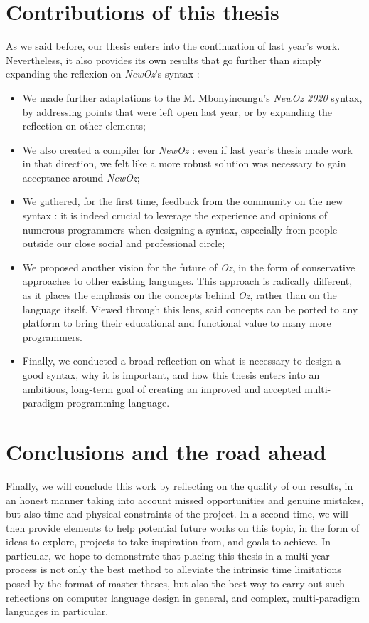 \section{Contributions of this thesis}\label{sec:ch1-3}
As we said before, our thesis enters into the continuation of last year's work.
Nevertheless, it also provides its own results that go further than simply expanding the reflexion on \textit{NewOz}'s syntax :
\begin{itemize}
    \item We made further adaptations to the M. Mbonyincungu's \textit{NewOz 2020} syntax, by addressing points that were left open last year, or by expanding the reflection on other elements;
    \item We also created a compiler for \textit{NewOz} : even if last year's thesis made work in that direction, we felt like a more robust solution was necessary to gain acceptance around \textit{NewOz};
    \item We gathered, for the first time, feedback from the community on the new syntax : it is indeed crucial to leverage the experience and opinions of numerous programmers when designing a syntax, especially from people outside our close social and professional circle;
    \item We proposed another vision for the future of \textit{Oz}, in the form of conservative approaches to other existing languages.
    This approach is radically different, as it places the emphasis on the concepts behind \textit{Oz}, rather than on the language itself.
    Viewed through this lens, said concepts can be ported to any platform to bring their educational and functional value to many more programmers.
    \item Finally, we conducted a broad reflection on what is necessary to design a good syntax, why it is important, and how this thesis enters into an ambitious, long-term goal of creating an improved and accepted multi-paradigm programming language.
\end{itemize}

\section{Conclusions and the road ahead}\label{sec:ch1-4}
Finally, we will conclude this work by reflecting on the quality of our results, in an honest manner taking into account missed opportunities and genuine mistakes, but also time and physical constraints of the project.
In a second time, we will then provide elements to help potential future works on this topic, in the form of ideas to explore, projects to take inspiration from, and goals to achieve.
In particular, we hope to demonstrate that placing this thesis in a multi-year process is not only the best method to alleviate the intrinsic time limitations posed by the format of master theses, but also the best way to carry out such reflections on computer language design in general, and complex, multi-paradigm languages in particular.
